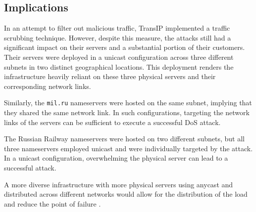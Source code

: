 \subsection{Implications} \label{subsec:ex_implications}
In an attempt to filter out malicious traffic, TransIP implemented a traffic scrubbing technique.
However, despite this measure, the attacks still had a significant impact on their servers and a substantial portion of their customers.
Their servers were deployed in a unicast configuration across three different subnets in two distinct geographical locations.
This deployment renders the infrastructure heavily reliant on these three physical servers and their corresponding network links.

Similarly, the \texttt{mil.ru} nameservers were hosted on the same subnet, implying that they shared the same network link.
In such configurations, targeting the network links of the servers can be sufficient to execute a successful DoS attack.

The Russian Railway nameservers were hosted on two different subnets, but all three nameservers employed unicast and were individually targeted by the attack.
In a unicast configuration, overwhelming the physical server can lead to a successful attack.

A more diverse infrastructure with more physical servers using anycast and distributed across different networks would allow for the distribution of the load and reduce the point of failure \cite{Sommese2022DDoSDNS}.